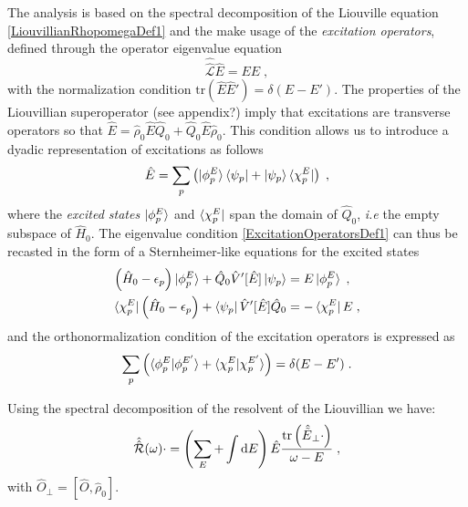 \documentclass[reprint,aps,prb]{revtex4-1}
\newcommand{\dd}{{\rm d}}
\newcommand{\eps}{\epsilon}
\newcommand{\be}{\begin{equation}}
\newcommand{\ee}{\end{equation}}
\newcommand{\nn}{\notag}
\newcommand{\qq}{\qquad}
\newcommand{\lb}{\label}
\newcommand{\op}[1]{\hat {#1}}
\newcommand{\sop}[1]{\op{\op {#1}}}
\newcommand{\commutator}[2]{\left[ {#1} , {#2} \right]}
\newcommand{\trace}[1]{\mathrm{tr}\left(#1\right)}
\newcommand{\opskew}[1]{{\op {#1}}_{\perp}}
\newcommand{\dmnot}{\op{\rho}_0}
\newcommand{\hnot}{\op{H}_0}
\newcommand{\Liouv}{\sop{\mathcal L}}
\begin{document}
The analysis is based on the spectral decomposition of the Liouville equation \eqref{LiouvillianRhopomegaDef1} and the make usage of the \emph{excitation operators}, defined through the 
operator eigenvalue equation
\be\lb{ExcitationOperatorsDef1}
\Liouv \op E = E \op E \;, %
\ee
with the normalization condition $\trace{\op E\op E'} = \delta(E-E')$.
The properties of the Liouvillian superoperator (see appendix?) imply that excitations are transverse operators so that $\op E = \dmnot\op E\op Q_0 + \op Q_0\op E\dmnot$. 
This condition allows us to introduce a dyadic representation of excitations as follows
\be\lb{ExcitationOperatorsDef2}
\op E = \sum_p \left( \ket{\phi^E_p}\bra{\psi_p} + \ket{\psi_p} \bra{\chi^E_p}\right)\;, 
\ee
where the \emph{excited states} $\ket{\phi^E_p}$ and $\bra{\chi^E_p}$ span the domain of $\op Q_0$, \emph{i.e} the empty subspace of $\hnot$. The eigenvalue condition \eqref{ExcitationOperatorsDef1} 
can thus be recasted in the form of a Sternheimer-like equations for the excited states
\begin{align}
\left(\hnot - \eps_p\right) \ket{\phi_p^E} + \op Q_0 \op V'[\op E] \ket{\psi_p} &= E \ket{\phi_p^E} \;, \\
\bra{\chi_p^E}\left(\hnot - \eps_p\right) + \bra{\psi_p}\op V'[\op E]\op Q_0   &= -\bra{\chi_p^E} E  \;, \nn
\end{align}
and the orthonormalization condition of the excitation operators is expressed as 
\be
\sum_p \left(\braket{\phi_p^E | \phi_p^{E'}} + \braket{\chi_p^E | \chi_p^{E'}}\right) = \delta(E-E') \;. \nn
\ee



\vspace{1cm}


Using the spectral decomposition of the resolvent of the Liouvillian we have:
\be\lb{RhopExcitationDef1}
\sop{{\cal R}}(\omega) \cdot   =
\left(\sum_E + \int\dd E   \right) \op E
\frac{\trace{\opskew{\tilde E}\cdot}}{\omega-E} \;,
\ee
with $\opskew{O} = \commutator{\op O}{\dmnot}$. 
\end{document}
